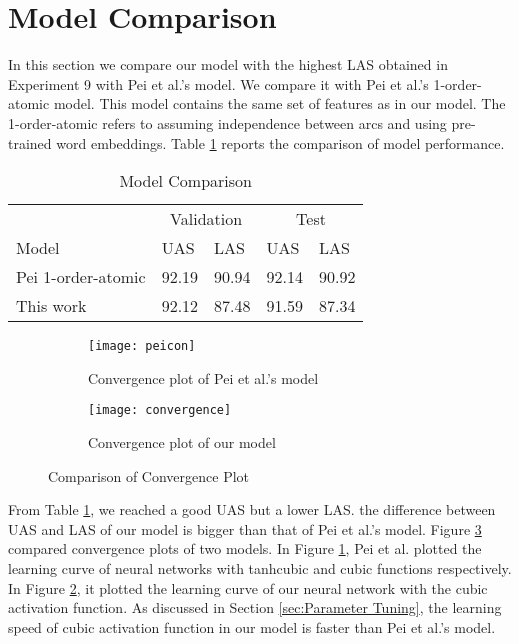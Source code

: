 \section{Model Comparison}
\label{sec:Model Comparison}
In this section we compare our model with the highest LAS obtained in Experiment 9 with Pei et al.'s model. We compare it with Pei et al.'s 1-order-atomic model. This model contains the same set of features as in our model. The 1-order-atomic refers to assuming independence between arcs and using pre-trained word embeddings. Table \ref{tab:compmd} reports the comparison of model performance. 

\begin{table}
\centering
    \begin{tabular}{@{}l l l l l@{}} \toprule
    & \multicolumn{2}{c}{Validation} & \multicolumn{2}{c}{Test} \\ 
    Model&UAS&LAS&UAS&LAS\\
    \cmidrule{2-3} \cmidrule{4-5}
    Pei 1-order-atomic&92.19&90.94&92.14&90.92 \\
    This work&92.12 &87.48&91.59&87.34\\  
    \bottomrule
    \end{tabular}
\caption{Model Comparison}\label{tab:compmd}
\end{table}

\begin{figure}
    \centering
    \begin{subfigure}[b]{0.48\textwidth}
        \texttt{[image: peicon]}
        \caption{Convergence plot of Pei et al.'s model}
        \label{fig:peicon}
    \end{subfigure}
    \begin{subfigure}[b]{0.48\textwidth}
        \texttt{[image: convergence]}
        \caption{Convergence plot of our model}
        \label{fig:converg}
    \end{subfigure}
    \caption{Comparison of Convergence Plot}\label{fig:comconverg}
\end{figure}

From Table \ref{tab:compmd}, we reached a good UAS but a lower LAS. the difference between UAS and LAS of our model is bigger than that of Pei et al.'s model. Figure \ref{fig:comconverg} compared convergence plots of two models. In Figure \ref{fig:peicon}, Pei et al. plotted the learning curve of neural networks with tanhcubic and cubic functions respectively. In Figure \ref{fig:converg}, it plotted the learning curve of our neural network with the cubic activation function. As discussed in Section \ref{sec:Parameter Tuning},  the learning speed of cubic activation function in our model is faster than Pei et al.'s model.

